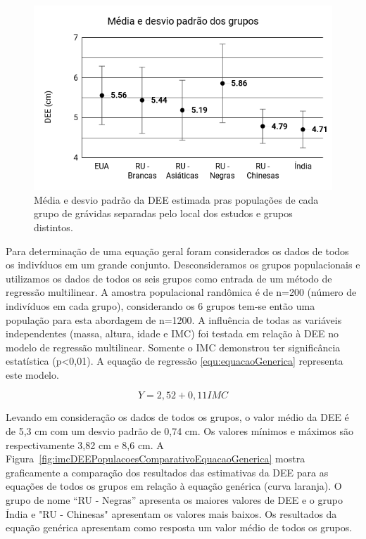 \begin{figure}[ht!]
    \centering
    \includegraphics[width=0.8\linewidth]{capitulos/figuras/Media e desvio padrao dos grupos.png} 
    \caption{Média e desvio padrão da \acrshort{DEE} estimada pras populações de cada grupo de grávidas separadas pelo local dos estudos e grupos distintos.}
    \label{fig:mediaDesvioPadraoPopulacoes}
\end{figure}

Para determinação de uma equação geral foram considerados os dados de todos os indivíduos em um grande conjunto. Desconsideramos os grupos populacionais e utilizamos os dados de todos os seis grupos como entrada de um método de regressão multilinear. A amostra populacional randômica é de n=200 (número de indivíduos em cada grupo), considerando os 6 grupos tem-se então uma população para esta abordagem de n=1200. A influência de todas as variáveis  independentes (massa, altura, idade e \acrshort{IMC}) foi testada em relação à \acrshort{DEE} no modelo de regressão multilinear. Somente o \acrshort{IMC} demonstrou ter significância estatística (p<0,01). A equação de regressão \ref{equ:equacaoGenerica} representa este modelo. 

\begin{equation}
\label{equ:equacaoGenerica}
Y=2,52+0,11 IMC
\end{equation}

Levando em consideração os dados de todos os grupos, o valor médio da \acrshort{DEE} é de 5,3 cm com um desvio padrão de 0,74 cm. Os valores mínimos e máximos são respectivamente 3,82 cm e 8,6 cm. A Figura~\ref{fig:imcDEEPopulacoesComparativoEquacaoGenerica} mostra graficamente a comparação dos resultados das estimativas da  \acrshort{DEE} para as equações de todos os grupos em relação à equação genérica (curva laranja). O grupo de nome “RU - Negras” apresenta os maiores valores de \acrshort{DEE} e o grupo Índia e "RU - Chinesas" apresentam os valores mais baixos. Os resultados da equação genérica apresentam como resposta um valor médio de todos os grupos.

